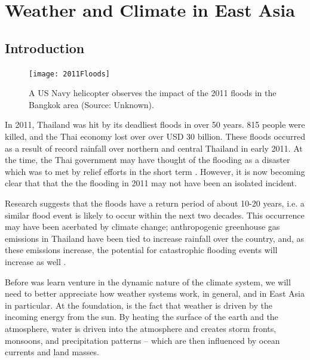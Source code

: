 \chapter{Weather and Climate in East Asia}\label{ch:climate}

\maketitle

\section{Introduction}

\begin{figure}
  \texttt{[image: 2011Floods]}
  \caption{A US Navy helicopter observes the impact of the 2011 floods in the Bangkok area (Source: Unknown).}
  \label{fig:2011floods}
\end{figure}

In 2011, Thailand was hit by its deadliest floods in over 50 years. 815 people were killed, and the Thai economy lost over over USD 30 billion. These floods occurred as a result of record rainfall over northern and central Thailand in early 2011. At the time, the Thai government may have thought of the flooding as a disaster which was to met by relief efforts in the short term  \citep{floodfailure}. However, it is now becoming clear that that the the flooding in 2011 may not have been an isolated incident.

Research suggests that the floods have a return period of about 10-20 years, i.e. a similar flood event is likely to occur within the next two decades\citep{galeandsaunders}. This occurrence may have been acerbated by climate change; anthropogenic greenhouse gas emissions in Thailand have been tied to increase rainfall over the country, and, as these emissions increase, the potential for catastrophic flooding events will increase as well \citep{floodclimate}. 

Before was learn venture in the dynamic nature of the climate system, we will need to better appreciate how weather systems work, in general, and in East Asia in particular. At the foundation, is the fact that weather is driven by the incoming energy from the sun. By heating the surface of the earth and the atmosphere, water is driven into the atmosphere and creates storm fronts, monsoons, and precipitation patterns -- which are then influenced by ocean currents and land masses. 

